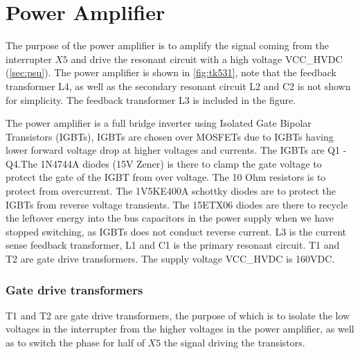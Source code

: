 

\newpage
\section{Power Amplifier}
\label{sec:pa}

The purpose of the power amplifier is to amplify the signal coming from the interrupter $X5$ and drive the resonant circuit with a high voltage VCC\_HVDC (\cref{sec:psu}). The power amplifier is shown in \cref{fig:tk531}, note that the feedback transformer L4, as well as the secondary resonant circuit L2 and C2 is not shown for simplicity. The feedback transformer L3 is included in the figure.

The power amplifier is a full bridge inverter using Isolated Gate Bipolar Transistors (IGBTs), IGBTs are chosen over MOSFETs due to IGBTs having lower forward voltage drop at higher voltages and currents. The IGBTs are Q1 - Q4.The 1N4744A diodes (15V Zener) is there to clamp the gate voltage to protect the gate of the IGBT from over voltage. The 10 Ohm resistors is to protect from overcurrent. The 1V5KE400A schottky diodes are to protect the IGBTs from reverse voltage transients. The 15ETX06 diodes are there to recycle the leftover energy into the bus capacitors in the power supply when we have stopped switching, as IGBTs does not conduct reverse current. L3 is the current sense feedback transformer, L1 and C1 is the primary resonant circuit. T1 and T2 are gate drive transformers. The supply voltage VCC\_HVDC is 160VDC.

\subsubsection{Gate drive transformers}
T1 and T2 are gate drive transformers, the purpose of which is to isolate the low voltages in the interrupter from the higher voltages in the power amplifier, as well as to switch the phase for half of $X5$ the signal driving the transistors.


